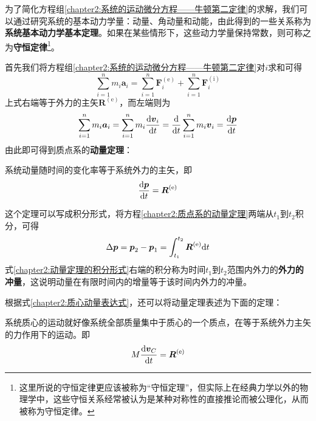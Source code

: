 为了简化方程组\eqref{chapter2:系统的运动微分方程——牛顿第二定律}的求解，我们可以通过研究系统的基本动力学量：动量、角动量和动能，由此得到的一些关系称为{\bf 系统基本动力学基本定理}。如果在某些情形下，这些动力学量保持常数，则可称之为{\bf 守恒定律}\footnote{这里所说的守恒定律更应该被称为“守恒定理”，但实际上在经典力学以外的物理学中，这些守恒关系经常被认为是某种对称性的直接推论而被公理化，从而被称为守恒定律。}。

首先我们将方程组\eqref{chapter2:系统的运动微分方程——牛顿第二定律}对$i$求和可得
\begin{equation}
	\sum_{i=1}^nm_i\boldsymbol{a}_i = \sum_{i=1}^n \boldsymbol{F}_i^{(\mathrm{e})} + \sum_{i=1}^n \boldsymbol{F}_i^{(\mathrm{i})}
\end{equation}
上式右端等于外力的主矢$\boldsymbol{R}^{(\mathrm{e})}$，而左端则为
\begin{equation}
	\sum_{i=1}^nm_i\boldsymbol{a}_i = \sum_{i=1}^n m_i\frac{\mathrm{d}\boldsymbol{v}_i}{\mathrm{d} t} = \frac{\mathrm{d}}{\mathrm{d} t}\sum_{i=1}^n m_i\boldsymbol{v}_i = \dfrac{\mathrm{d} \boldsymbol{p}}{\mathrm{d} t}
\end{equation}
由此即可得到质点系的{\bf 动量定理}：

\begin{theorem}[动量定理]
	\label{chapter2:质点系的动量定理}
	系统动量随时间的变化率等于系统外力的主矢，即
	\begin{equation}
		\frac{\mathrm{d}\boldsymbol{p}}{\mathrm{d} t} = \boldsymbol{R}^{(\mathrm{e})}
		\label{chapter2:质点系的动量定理}
	\end{equation}
\end{theorem}

这个定理可以写成积分形式，将方程\eqref{chapter2:质点系的动量定理}两端从$t_1$到$t_2$积分，可得
\begin{equation}
	\Delta \boldsymbol{p} = \boldsymbol{p}_2 - \boldsymbol{p}_1 = \int_{t_1}^{t_2}\boldsymbol{R}^{(\mathrm{e})}\mathrm{d} t
	\label{chapter2:动量定理的积分形式}
\end{equation}
式\eqref{chapter2:动量定理的积分形式}右端的积分称为时间$t_1$到$t_2$范围内外力的{\bf 外力的冲量}，这说明动量在有限时间内的增量等于该时间内外力的冲量。

根据式\eqref{chapter2:质心动量表达式}，还可以将动量定理表述为下面的定理：

\begin{theorem}[质心运动定理]
	\label{chapter2:质心运动定理}
	系统质心的运动就好像系统全部质量集中于质心的一个质点，在等于系统外力主矢的力作用下的运动。即
	\begin{equation}
		M\dfrac{\mathrm{d} \boldsymbol{v}_C}{\mathrm{d} t} = \boldsymbol{R}^{(\mathrm{e})}
	\end{equation}
\end{theorem}

